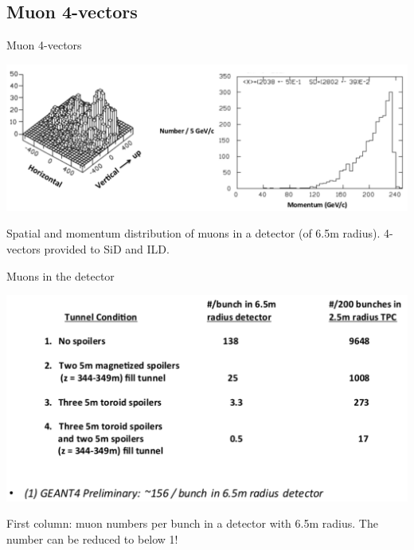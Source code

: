 \documentclass[xcolor={dvipsnames}]{beamer}
\begin{document}
\subsection{Muon 4-vectors}
\begin{frame}{Muon 4-vectors}
\begin{center}
\includegraphics[height=0.5\textheight]{Muon_4-vectors.pdf}
\end{center}
Spatial and momentum distribution of muons in a detector (of 6.5m radius).
4-vectors provided to SiD and ILD.
\end{frame}
\begin{frame}{Muons in the detector}
\begin{center}
\includegraphics[height=0.6\textheight]{Muon_numbers.pdf}
\end{center}
First column: muon numbers per bunch in a detector with 6.5m radius.
The number can be reduced to below 1!
\end{frame}
\end{document}
